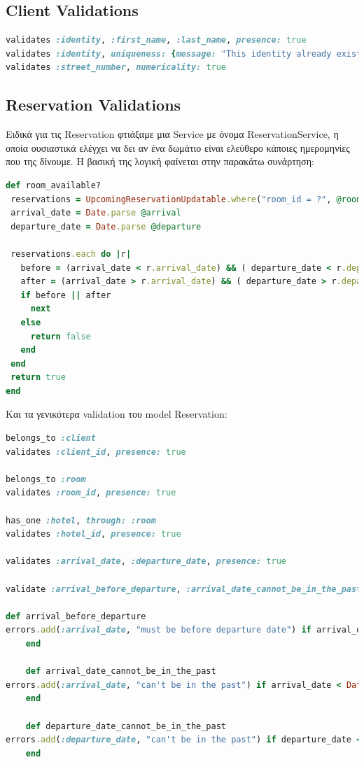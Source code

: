 \documentclass[a4paper,12pt]{article}
\begin{document}
\subsection{Client Validations}
	\begin{lstlisting}[language=Ruby]
validates :identity, :first_name, :last_name, presence: true
validates :identity, uniqueness: {message: "This identity already exists. Identity must be unique!"}
validates :street_number, numericality: true
	\end{lstlisting}
	
\subsection{Reservation Validations}
	Ειδικά για τις Reservation φτιάξαμε μια Service με όνομα ReservationService, η οποία ουσιαστικά ελέγχει να δει αν ένα δωμάτιο είναι ελεύθερο κάποιες ημερομηνίες που της δίνουμε. Η βασική της λογική φαίνεται στην παρακάτω συνάρτηση:
	
	\begin{lstlisting}[language=Ruby]
def room_available?
 reservations = UpcomingReservationUpdatable.where("room_id = ?", @room.id)
 arrival_date = Date.parse @arrival
 departure_date = Date.parse @departure

 reservations.each do |r|
   before = (arrival_date < r.arrival_date) && ( departure_date < r.departure_date)
   after = (arrival_date > r.arrival_date) && ( departure_date > r.departure_date)
   if before || after
     next
   else
     return false
   end
 end
 return true
end
	\end{lstlisting}
	Και τα γενικότερα validation του model Reservation:
	\begin{lstlisting}[language=Ruby]
belongs_to :client
validates :client_id, presence: true

belongs_to :room
validates :room_id, presence: true

has_one :hotel, through: :room
validates :hotel_id, presence: true

validates :arrival_date, :departure_date, presence: true

validate :arrival_before_departure, :arrival_date_cannot_be_in_the_past, :departure_date_cannot_be_in_the_past

def arrival_before_departure
errors.add(:arrival_date, "must be before departure date") if arrival_date >= departure_date
 	end

 	def arrival_date_cannot_be_in_the_past
errors.add(:arrival_date, "can't be in the past") if arrival_date < Date.today
 	end

 	def departure_date_cannot_be_in_the_past
errors.add(:departure_date, "can't be in the past") if departure_date < Date.today
 	end
	\end{lstlisting}
\end{document}
